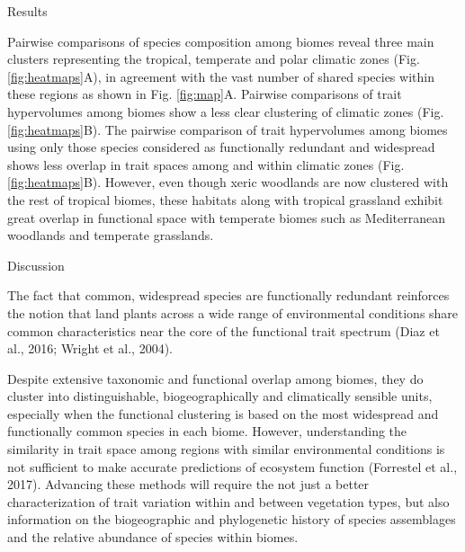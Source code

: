 \documentclass[final]{beamer}
\newlength{\twocolwid}
\begin{document}
\begin{frame}[t]
\begin{columns}[t]
\begin{column}{\twocolwid}
\begin{alertblock}{Results}
\begin{multicols}{2}
Pairwise comparisons of species composition among biomes reveal three main clusters representing the tropical, temperate and polar climatic zones (Fig. \ref{fig:heatmaps}A), in agreement with the vast number of shared species within these regions as shown in Fig. \ref{fig:map}A. Pairwise comparisons of trait hypervolumes among biomes show a less clear clustering of climatic zones (Fig. \ref{fig:heatmaps}B). The pairwise comparison of trait hypervolumes among biomes using only those species considered as functionally redundant and widespread shows less overlap in trait spaces among and within climatic zones (Fig. \ref{fig:heatmaps}B). However, even though xeric woodlands are now clustered with the rest of tropical biomes, these habitats along with tropical grassland exhibit great overlap in functional space with temperate biomes such as Mediterranean woodlands and temperate grasslands. 

\end{multicols}
\end{alertblock}



			\begin{alertblock}{Discussion}
			
The fact that common, widespread species are functionally redundant reinforces the notion that land plants across a wide range of environmental conditions share common characteristics near the core of the functional trait spectrum (Diaz et al., 2016; Wright et al., 2004). 

Despite extensive taxonomic and functional overlap among biomes, they do cluster into distinguishable, biogeographically and climatically sensible units, especially when the functional clustering is based on the most widespread and functionally common species in each biome. However, understanding the similarity in trait space among regions with similar environmental conditions is not sufficient to make accurate predictions of ecosystem function (Forrestel et al., 2017). Advancing these methods will require the not just a better characterization of trait variation within and between vegetation types, but also information on the biogeographic and phylogenetic history of species assemblages and the relative abundance of species within biomes.

      		\end{alertblock}

 \end{column}




\end{columns}
\end{frame}
\end{document}
